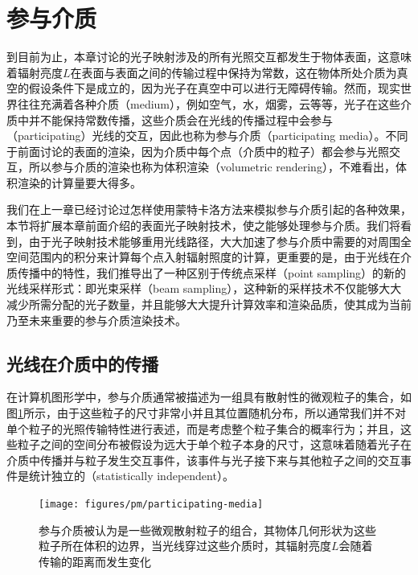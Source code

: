 \section{参与介质}\label{sec:pm-participating-media}
到目前为止，本章讨论的光子映射涉及的所有光照交互都发生于物体表面，这意味着辐射亮度$L$在表面与表面之间的传输过程中保持为常数，这在物体所处介质为真空的假设条件下是成立的，因为光子在真空中可以进行无障碍传输。然而，现实世界往往充满着各种介质（medium），例如空气，水，烟雾，云等等，光子在这些介质中并不能保持常数传播，这些介质会在光线的传播过程中会参与（participating）光线的交互，因此也称为参与介质（participating media）。不同于前面讨论的表面的渲染，因为介质中每个点（介质中的粒子）都会参与光照交互，所以参与介质的渲染也称为体积渲染（volumetric rendering），不难看出，体积渲染的计算量要大得多。

我们在上一章已经讨论过怎样使用蒙特卡洛方法来模拟参与介质引起的各种效果，本节将扩展本章前面介绍的表面光子映射技术，使之能够处理参与介质。我们将看到，由于光子映射技术能够重用光线路径，大大加速了参与介质中需要的对周围全空间范围内的积分来计算每个点入射辐射照度的计算，更重要的是，由于光线在介质传播中的特性，我们推导出了一种区别于传统点采样（point sampling）的新的光线采样形式：即光束采样（beam sampling），这种新的采样技术不仅能够大大减少所需分配的光子数量，并且能够大大提升计算效率和渲染品质，使其成为当前乃至未来重要的参与介质渲染技术。




\subsection{光线在介质中的传播}
在计算机图形学中，参与介质通常被描述为一组具有散射性的微观粒子的集合，如图\ref{f:pm-participating-media}所示，由于这些粒子的尺寸非常小并且其位置随机分布，所以通常我们并不对单个粒子的光照传输特性进行表述，而是考虑整个粒子集合的概率行为；并且，这些粒子之间的空间分布被假设为远大于单个粒子本身的尺寸，这意味着随着光子在介质中传播并与粒子发生交互事件，该事件与光子接下来与其他粒子之间的交互事件是统计独立的（statistically independent）。

\begin{figure}
	\sidecaption
	\texttt{[image: figures/pm/participating-media]}
	\caption{参与介质被认为是一些微观散射粒子的组合，其物体几何形状为这些粒子所在体积的边界，当光线穿过这些介质时，其辐射亮度$L$会随着传输的距离而发生变化}
	\label{f:pm-participating-media}
\end{figure}




